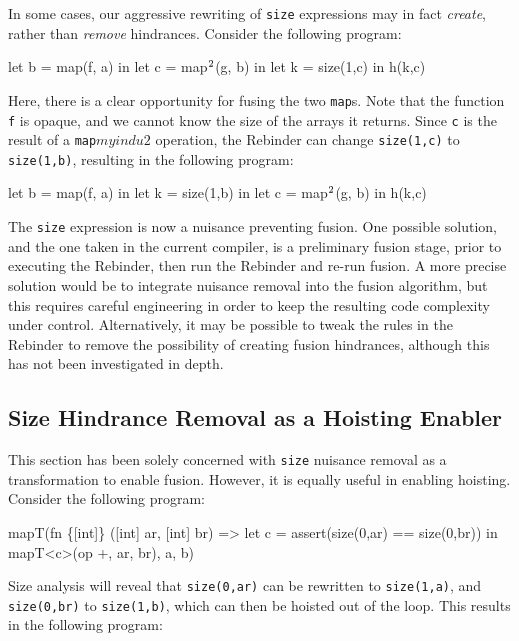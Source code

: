 In some cases, our aggressive rewriting of \texttt{size} expressions
may in fact \textit{create}, rather than \textit{remove} hindrances.
Consider the following program:

\begin{colorcode}
let b = map(f, a) in
let c = map\(^{2}\)(g, b) in
let k = size(1,c) in
h(k,c)
\end{colorcode}

Here, there is a clear opportunity for fusing the two \texttt{map}s.
Note that the function \texttt{f} is opaque, and we cannot know the
size of the arrays it returns.  Since \texttt{c} is the result of a
\texttt{map\(myindu{2}\)} operation, the Rebinder can change
\texttt{size(1,c)} to \texttt{size(1,b)}, resulting in the following
program:

\begin{colorcode}
let b = map(f, a) in
let k = size(1,b) in
let c = map\(^{2}\)(g, b) in
h(k,c)
\end{colorcode}

The \texttt{size} expression is now a nuisance preventing fusion.  One
possible solution, and the one taken in the current \LO{} compiler, is
a preliminary fusion stage, prior to executing the Rebinder, then run
the Rebinder and re-run fusion.  A more precise solution would be to
integrate nuisance removal into the fusion algorithm, but this
requires careful engineering in order to keep the resulting code
complexity under control.  Alternatively, it may be possible to tweak
the rules in the Rebinder to remove the possibility of creating fusion
hindrances, although this has not been investigated in depth.

\subsection{Size Hindrance Removal as a Hoisting Enabler}
\label{sec:hoisting-enabler}

This section has been solely concerned with \texttt{size} nuisance
removal as a transformation to enable fusion.  However, it is equally
useful in enabling hoisting.  Consider the following program:

\begin{colorcode}
mapT(fn \{[int]\} ([int] ar, [int] br) =>
       let c = assert(size(0,ar) == size(0,br)) in
       mapT<c>(op +, ar, br),
     a, b)
\end{colorcode}

Size analysis will reveal that \texttt{size(0,ar)} can be rewritten to
\texttt{size(1,a)}, and \texttt{size(0,br)} to \texttt{size(1,b)},
which can then be hoisted out of the loop.  This results in the
following program:

